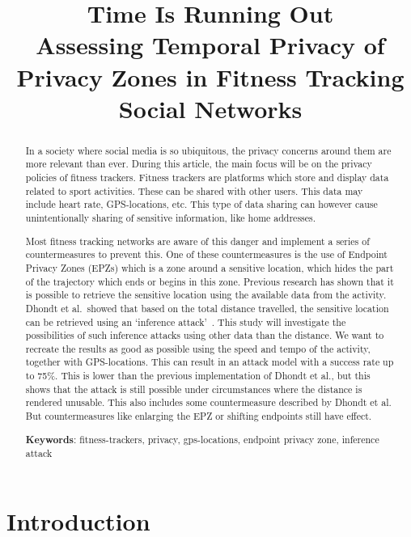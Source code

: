 \documentclass[conference]{IEEEtran}
\begin{document}
\title{\textbf{\LARGE Time Is Running Out\\
        \large Assessing Temporal Privacy of Privacy Zones in Fitness Tracking Social Networks}
}

\author{
}
\maketitle

\begin{abstract}
    In a society where social media is so ubiquitous, the privacy concerns
    around them are more relevant than ever.  During this article, the main
    focus will be on the privacy policies of fitness trackers. Fitness trackers are
    platforms which store and display data related to sport activities. These can
    be shared with other users. This data may include heart rate, GPS-locations,
    etc. This type of data sharing can however cause unintentionally sharing of
    sensitive information, like home addresses.

    Most fitness tracking networks are aware of this danger and implement a series
    of countermeasures to prevent this. One of these countermeasures is the use of
    Endpoint Privacy Zones (EPZs) which is a zone around a sensitive location,
    which hides the part of the trajectory which ends or begins in this zone.
    Previous research has shown that it is possible to retrieve the sensitive
    location using the available data from the activity. Dhondt et al.\ showed that
    based on the total distance travelled, the sensitive location can be retrieved
    using an `inference attack'~\cite{Dhondt}. This study will investigate the
    possibilities of such inference attacks using other data than the distance. We
    want to recreate the results as good as possible using the speed and tempo of
    the activity, together with GPS-locations. This can result in an attack model
    with a success rate up to 75\%. This is lower than the previous implementation
    of Dhondt et al., but this shows that the attack is still possible under
    circumstances where the distance is rendered unusable. This also includes some
    countermeasure described by Dhondt et al. But countermeasures like enlarging
    the EPZ or shifting endpoints still have effect.\vspace{10pt}

    \textbf{Keywords}: fitness-trackers, privacy, gps-locations, endpoint privacy
    zone, inference attack
\end{abstract}

\section{Introduction}



\end{document}
